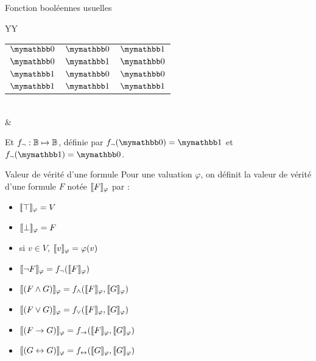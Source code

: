 \documentclass[10pt]{beamer}
\begin{document}
\begin{frame}{\Ctitle}{\stitle}
\begin{block}{Fonction booléennes usuelles}
\begin{tabularx}{\textwidth}{YY}
\begin{tabular}{l|l|l}
				\hline
				 $\faux$ &  $\faux$ &  $\vrai$            \\
				 $\faux$ &  $\vrai$ &  $\faux$            \\
				 $\vrai$ &  $\faux$ &  $\faux$            \\
				 $\vrai$ &  $\vrai$ &  $\vrai$            \\
			\end{tabular}      \\
			                                                    & \\
		\end{tabularx}
		Et $f_{\neg} : \mathbb{B} \mapsto \mathbb{B}$, définie par $f_\non(\faux) = \vrai$ et $f_\non(\vrai) = \faux$.
	\end{block}
\end{frame}

\begin{frame}{\Ctitle}{\stitle}
	\begin{alertblock}{Valeur de vérité d'une formule}
		Pour une valuation $\varphi$, on définit la valeur de vérité d'une formule $F$ notée $\llbracket F \rrbracket_{\varphi}$ par :
		\begin{itemize}
			\item<2-> $\llbracket \top \rrbracket_{\varphi} = V$
			\item<2-> $\llbracket \bot \rrbracket_{\varphi} = F$
			\item<3-> si $v \in V$, $\llbracket v \rrbracket_{\varphi} = \varphi(v)$
			\item<4-> $\llbracket \neg F \rrbracket_{\varphi} = f_{\neg}(\llbracket F \rrbracket_{\varphi})$
			\item<5-> $\llbracket (F \wedge G) \rrbracket_{\varphi} = f_{\wedge}(\llbracket F \rrbracket_{\varphi},\llbracket G \rrbracket_{\varphi})$
			\item<5-> $\llbracket (F \vee G) \rrbracket_{\varphi} = f_{\vee}(\llbracket F \rrbracket_{\varphi},\llbracket G \rrbracket_{\varphi})$
			\item<5-> $\llbracket (F \to G) \rrbracket_{\varphi} = f_{\to}(\llbracket F \rrbracket_{\varphi},\llbracket G \rrbracket_{\varphi})$
			\item<5-> $\llbracket (G \leftrightarrow G) \rrbracket_{\varphi} = f_{\leftrightarrow}(\llbracket G \rrbracket_{\varphi},\llbracket G \rrbracket_{\varphi})$
		\end{itemize}
	\end{alertblock}
\end{frame}
\end{document}
